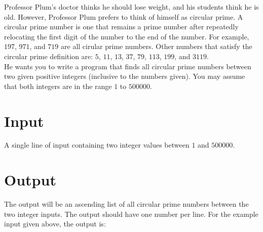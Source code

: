 
Professor Plum’s doctor thinks he should lose weight, and his students think he is old. However, Professor Plum prefers to think of himself as circular prime. A circular prime number is one that remains a prime number after repeatedly relocating the first digit of the number to the end of the number.  For example, $197$, $971$, and $719$ are all cirular prime numbers. Other numbers that satisfy the circular prime definition are:  $5$, $11$, $13$, $37$, $79$, $113$, $199$, and $3119$.  \\

He wants you to write a program that finds all circular prime numbers between two given positive integers (inclusive to the numbers given). You may assume that both integers are in the range $1$ to $500000$.

\section*{Input}
A single line of input containing two integer values between $1$ and $500000$.  

\section*{Output}
The output will be an ascending list of all circular prime numbers between the two integer inputs.  The output should have one number per line.  For the example input given above, the output is: